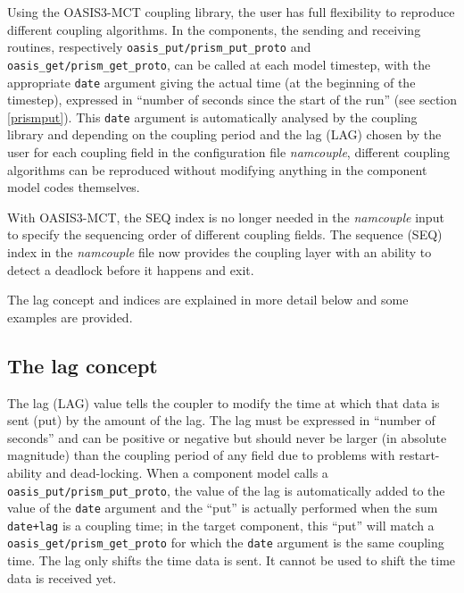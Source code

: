 Using the OASIS3-MCT coupling library, the user has full flexibility to reproduce
different coupling algorithms. In the components, the sending and
receiving routines, respectively {\tt oasis\_put/prism\_put\_proto} and {\tt
   oasis\_get/prism\_get\_proto}, can be called at each model timestep, with the
appropriate {\tt date} argument giving the actual time (at the
beginning of the timestep), expressed in ``number of seconds since the
start of the run'' (see section \ref{prismput}). This {\tt date} argument is automatically analysed
by the coupling library
and depending on the coupling period and the lag (LAG) chosen by the 
user for each coupling field in the configuration file {\it namcouple}, different
coupling algorithms can be reproduced without modifying anything in the
component model codes themselves. 

With OASIS3-MCT, the SEQ index is no longer needed in the {\it namcouple}
input to specify the sequencing order of different coupling fields.
The sequence (SEQ) index in the {\it namcouple} file now provides the coupling 
layer with an ability to detect a deadlock before it happens and exit.

The lag concept and indices are explained in more detail below and some
examples are provided.

\subsection{The lag concept}
\label{subsub_lag}

The lag (LAG) value tells the coupler to modify the time at which that data
is sent (put) by the amount of the lag.  The lag must be
expressed in ``number of seconds'' and can be positive or
negative but should never be larger (in absolute magnitude) than the
coupling period of any field due to problems with restart-ability and
dead-locking. When a component model calls a {\tt oasis\_put/prism\_put\_proto}, the value of the lag is automatically added to the value of the {\tt date} argument and the ``put'' is actually performed when the sum {\tt date+lag} is a coupling time; in the target component, this ``put'' will match a {\tt oasis\_get/prism\_get\_proto} for which the {\tt date} argument is the same coupling time.
The lag only shifts the time data is sent.  It cannot be used to shift the time data is received yet.
 
